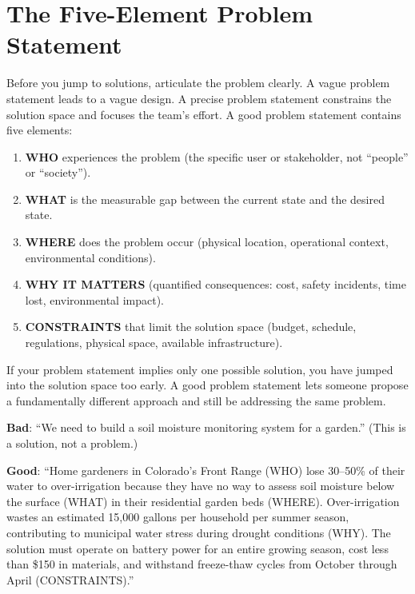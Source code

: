 \section{The Five-Element Problem Statement}
Before you jump to solutions, articulate the problem clearly. A vague problem statement leads to a vague design. A precise problem statement constrains the solution space and focuses the team's effort. A good problem statement contains five elements:

\begin{enumerate}[nosep,leftmargin=1.5em]
\item \textbf{WHO} experiences the problem (the specific user or stakeholder, not ``people'' or ``society'').
\item \textbf{WHAT} is the measurable gap between the current state and the desired state.
\item \textbf{WHERE} does the problem occur (physical location, operational context, environmental conditions).
\item \textbf{WHY IT MATTERS} (quantified consequences: cost, safety incidents, time lost, environmental impact).
\item \textbf{CONSTRAINTS} that limit the solution space (budget, schedule, regulations, physical space, available infrastructure).
\end{enumerate}

If your problem statement implies only one possible solution, you have jumped into the solution space too early. A good problem statement lets someone propose a fundamentally different approach and still be addressing the same problem.

\begin{examplebox}
\textbf{Bad}: ``We need to build a soil moisture monitoring system for a garden.'' (This is a solution, not a problem.)

\textbf{Good}: ``Home gardeners in Colorado's Front Range (WHO) lose 30--50\% of their water to over-irrigation because they have no way to assess soil moisture below the surface (WHAT) in their residential garden beds (WHERE). Over-irrigation wastes an estimated 15,000 gallons per household per summer season, contributing to municipal water stress during drought conditions (WHY). The solution must operate on battery power for an entire growing season, cost less than \$150 in materials, and withstand freeze-thaw cycles from October through April (CONSTRAINTS).''
\end{examplebox}

